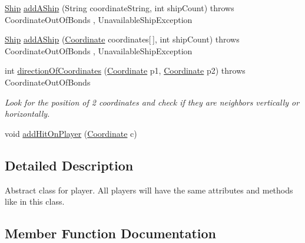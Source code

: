 \begin{DoxyCompactItemize}
\item 
\hyperlink{classbattleGame_1_1src_1_1version1_1_1Ship}{Ship} \hyperlink{classbattleGame_1_1src_1_1version1_1_1Player_a68b87b53945094f48d29b0b8e9d0740c}{add\+A\+Ship} (String coordinate\+String, int ship\+Count)  throws Coordinate\+Out\+Of\+Bonds , Unavailable\+Ship\+Exception 
\item 
\hyperlink{classbattleGame_1_1src_1_1version1_1_1Ship}{Ship} \hyperlink{classbattleGame_1_1src_1_1version1_1_1Player_afb2121362bde9b79dbf1ece9ca841da9}{add\+A\+Ship} (\hyperlink{classbattleGame_1_1src_1_1version1_1_1Coordinate}{Coordinate} coordinates\mbox{[}$\,$\mbox{]}, int ship\+Count)  throws Coordinate\+Out\+Of\+Bonds , Unavailable\+Ship\+Exception 
\item 
int \hyperlink{classbattleGame_1_1src_1_1version1_1_1Player_a8799452b1f2c8d24cd49bbdf0ee5f687}{direction\+Of\+Coordinates} (\hyperlink{classbattleGame_1_1src_1_1version1_1_1Coordinate}{Coordinate} p1, \hyperlink{classbattleGame_1_1src_1_1version1_1_1Coordinate}{Coordinate} p2)  throws Coordinate\+Out\+Of\+Bonds
\begin{DoxyCompactList}\small\item\em Look for the position of 2 coordinates and check if they are neighbors vertically or horizontally. \end{DoxyCompactList}\item 
void \hyperlink{classbattleGame_1_1src_1_1version1_1_1Player_a81b6a58833eb15dd70f21c3dcdc88068}{add\+Hit\+On\+Player} (\hyperlink{classbattleGame_1_1src_1_1version1_1_1Coordinate}{Coordinate} c)
\end{DoxyCompactItemize}


\subsection{Detailed Description}
Abstract class for player. All players will have the same attributes and methods like in this class. 

\subsection{Member Function Documentation}
